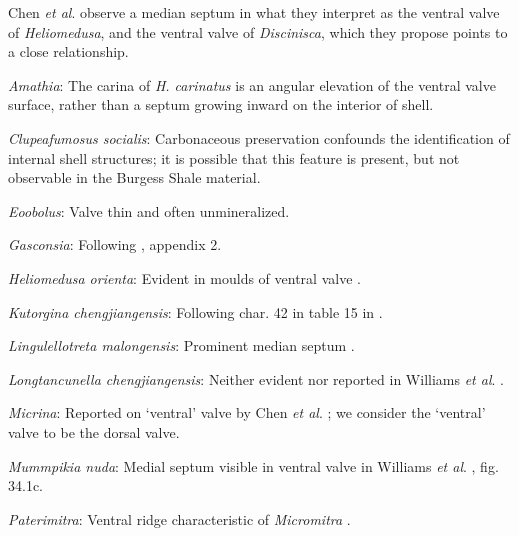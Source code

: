 \documentclass[openany]{book}
\theoremstyle{definition}
\theoremstyle{definition}
\theoremstyle{definition}
\theoremstyle{remark}
\begin{document}
Chen \emph{et al}. \citeyearpar{Chen2007Reinterpretationof} observe a
median septum in what they interpret as the ventral valve of
\emph{Heliomedusa}, and the ventral valve of \emph{Discinisca}, which
they propose points to a close relationship.

\hypertarget{Amathia-coding-117}{}
\emph{Amathia}: The carina of \emph{H. carinatus} is an angular
elevation of the ventral valve surface, rather than a septum growing
inward on the interior of shell.

\hypertarget{Clupeafumosus_socialis-coding-117}{}
\emph{Clupeafumosus socialis}: Carbonaceous preservation confounds the
identification of internal shell structures; it is possible that this
feature is present, but not observable in the Burgess Shale material.

\hypertarget{Eoobolus-coding-117}{}
\emph{Eoobolus}: Valve thin and often unmineralized.

\hypertarget{Gasconsia-coding-117}{}
\emph{Gasconsia}: Following \citet{Williams1998Thediversity}, appendix
2.

\hypertarget{Heliomedusa_orienta-coding-117}{}
\emph{Heliomedusa orienta}: Evident in moulds of ventral valve
\citep{Hanken1985Thetaxonomy, Watkins2002Newrecord}.

\hypertarget{Kutorgina_chengjiangensis-coding-117}{}
\emph{Kutorgina chengjiangensis}: Following char. 42 in table 15 in
\citet{Williams2000LinguliformeaCraniiformea}.

\hypertarget{Lingulellotreta_malongensis-coding-117}{}
\emph{Lingulellotreta malongensis}: Prominent median septum \citep[fig.
4d, e in][]{Balthasar2009Thebrachiopod}.

\hypertarget{Longtancunella_chengjiangensis-coding-117}{}
\emph{Longtancunella chengjiangensis}: Neither evident nor reported in
Williams \emph{et al}.
\citeyearpar{Williams2000LinguliformeaCraniiformea}.

\hypertarget{Micrina-coding-117}{}
\emph{Micrina}: Reported on `ventral' valve by Chen \emph{et al}.
\citeyearpar{Chen2007Reinterpretationof}; we consider the `ventral'
valve to be the dorsal valve.

\hypertarget{Mummpikia_nuda-coding-117}{}
\emph{Mummpikia nuda}: Medial septum visible in ventral valve in
Williams \emph{et al}.
\citeyearpar{Williams2000LinguliformeaCraniiformea}, fig. 34.1c.

\hypertarget{Paterimitra-coding-117}{}
\emph{Paterimitra}: Ventral ridge characteristic of \emph{Micromitra}
\citep{Skovsted2010EarlyCambrian}.
\end{document}
